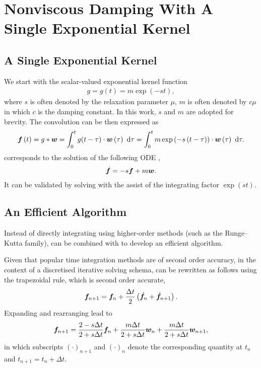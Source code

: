 \section{Nonviscous Damping With A Single Exponential Kernel}
\subsection{A Single Exponential Kernel}
We start with the scalar-valued exponential kernel function
\begin{gather}
g=g\left(t\right)=m\exp\left(-st\right),
\end{gather}
where $s$ is often denoted by the relaxation parameter $\mu$, $m$ is often denoted by $c\mu$ in which $c$ is the damping constant. In this work, $s$ and $m$ are adopted for brevity.
The convolution can be then expressed as
\begin{gather}\label{eq:single_conv}
\bm{f}\left(t\right)=g*\bm{w}=\int_0^tg(t-\tau)\cdot\bm{w}\left(\tau\right)~\mathrm{d}\tau=\int_0^tm\exp\left(-s\left(t-\tau\right)\right)\cdot\bm{w}\left(\tau\right)~\mathrm{d}\tau.
\end{gather}
 corresponds to the solution of the following ODE \citep[see, e.g.,][\S~80]{Zwillinger2021},
\begin{gather}\label{eq:single_conv_ode}
\dot{\bm{f}}=-s\bm{f}+m\bm{w}.
\end{gather}
It can be validated by solving  with the assist of the integrating factor $\exp\left(st\right)$.
\subsection{An Efficient Algorithm}
Instead of directly integrating  using higher-order methods (such as the Runge--Kutta family),  can be combined with  to develop an efficient algorithm.

Given that popular time integration methods are of second order accuracy, in the context of a discretised iterative solving schema,  can be rewritten as follows using the trapezoidal rule, which is second order accurate,
\begin{gather}
\bm{f}_{n+1}=\bm{f}_n+\dfrac{\Delta{}t}{2}\left(\dot{\bm{f}}_n+\dot{\bm{f}}_{n+1}\right).
\end{gather}
Expanding and rearranging lead to
\begin{gather}\label{eq:discretised_c}
\bm{f}_{n+1}=\dfrac{2-s\Delta{}t}{2+s\Delta{}t}\bm{f}_n+\dfrac{m\Delta{}t}{2+s\Delta{}t}\bm{w}_n+\dfrac{m\Delta{}t}{2+s\Delta{}t}\bm{w}_{n+1},
\end{gather}
in which subscripts $\left(\cdot\right)_{n+1}$ and $\left(\cdot\right)_n$ denote the corresponding quantity at $t_n$ and $t_{n+1}=t_n+\Delta{}t$.


